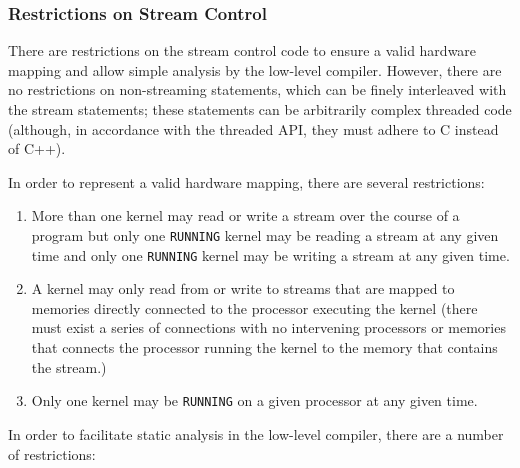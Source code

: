 \subsubsection{Restrictions on Stream Control}

There are restrictions on the stream control code to ensure a valid hardware
mapping and allow simple analysis by the low-level compiler.
However, there are no restrictions on non-streaming statements, which
can be finely interleaved with the stream statements; these statements
can be arbitrarily complex threaded code (although, in accordance with
the threaded API, they must adhere to C instead of C++).

In order to represent a valid hardware mapping, there are several restrictions:

\begin{enumerate}

\item More than one kernel may read or write a stream over the course of a program
but only one {\tt RUNNING} kernel may be reading a stream at any given time and only one
{\tt RUNNING} kernel may be writing a stream at any given time.

\item A kernel may only read from or write to streams that are mapped
to memories directly connected to the processor executing the kernel
(there must exist a series of connections with no intervening 
processors or memories that connects the processor running the kernel to 
the memory that contains the stream.)

\item Only one kernel may be {\tt RUNNING} on a given processor at any given time.

\end{enumerate}

In order to facilitate static analysis in the
low-level compiler, there are a number of restrictions:

